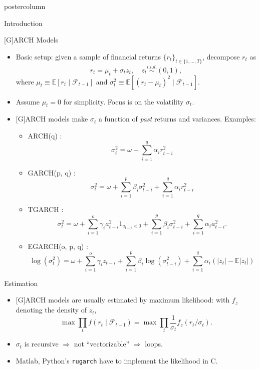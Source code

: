 \documentclass{beamer}
\begin{document}
\begin{frame}[fragile]
\begin{columns}
\begin{column}{.48\textwidth}
\begin{beamercolorbox}[center]{postercolumn}
\begin{myblock}{Introduction}
\end{myblock}\vfill
\begin{myblock}{[G]ARCH Models}
\begin{itemize}
\item Basic setup: given a sample of financial returns $\{r_t\}_{t\in\{1,\ldots,T\}}$, decompose $r_t$ as
\[
r_t=\mu_t+\sigma_tz_t, \quad z_t\stackrel{i.i.d.}{\sim}(0,1),
\]
where $\mu_t\equiv\mathbb{E}[r_t\mid \mathcal{F}_{t-1}]$ and $\sigma_t^2\equiv \mathbb{E}[(r_t-\mu_t)^2\mid \mathcal{F}_{t-1}]$.
\item Assume $\mu_t=0$ for simplicity. Focus is on the volatility $\sigma_t$.
\item {}[G]ARCH models make $\sigma_t$ a function of \emph{past} returns and variances. Examples:
\begin{itemize}
\item ARCH(q) \citep{en:82}:
\[
\sigma_t^2=\omega+\sum_{i=1}^q \alpha_ir_{t-i}^2%
\]
\item {\color{red}GARCH(p, q)} \citep{bo:86}:
\[
\sigma_t^2=\omega+ \sum_{i=1}^p\beta_{i}\sigma_{t-i}^2 + \sum_{i=1}^q\alpha_ir_{t-i}^2%
\]
\item TGARCH \citep{gjr:93}:
\[
\sigma_t^2=\omega+\sum_{i=1}^o\gamma_i  a_{t-i}^2 1_{a_{t-i}<0}+\sum_{i=1}^p\beta_i \sigma_{t-i}^2+\sum_{i=1}^q\alpha_i a_{t-i}^2.%
\]
\item EGARCH(o, p, q) \citep{ne:91}:
\[
\log(\sigma_t^2)=\omega+\sum_{i=1}^o\gamma_{i}z_{t-i}+\sum_{i=1}^p\beta_i\log(\sigma_{t-i}^2)+\sum_{i=1}^q \alpha_i (|z_t|-\mathbb{E}|z_t|)%
\]
\end{itemize}
\end{itemize}
\end{myblock}\vfill
\begin{myblock}{Estimation}
\begin{itemize}
\item {}[G]ARCH models are usually estimated by maximum likelihood: with $f_z$ denoting the density of $z_t$,
\[\max \prod_t f(r_t\mid \mathcal{F}_{t-1})=\max \prod_t\frac{1}{\sigma_t}f_z(r_t/\sigma_t).\]
\item {\color{red}$\sigma_t$ is recursive} $\Rightarrow$ not ``vectorizable'' $\Rightarrow$ {\color{red}loops}.
\item Matlab, Python's \texttt{rugarch} have to implement the likelihood in C.

\end{itemize}
\end{myblock}
\end{beamercolorbox}
\end{column}
\end{columns}
\end{frame}
\end{document}
